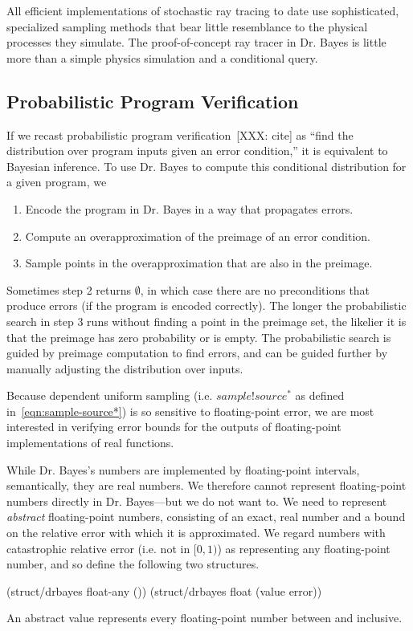 All efficient implementations of stochastic ray tracing to date use sophisticated, specialized sampling methods that bear little resemblance to the physical processes they simulate.
The proof-of-concept ray tracer in Dr. Bayes is little more than a simple physics simulation and a conditional query.


\subsection{Probabilistic Program Verification}

If we recast probabilistic program verification~[XXX: cite] as ``find the distribution over program inputs given an error condition,'' it is equivalent to Bayesian inference.
To use Dr. Bayes to compute this conditional distribution for a given program, we
\begin{enumerate}
	\item Encode the program in Dr. Bayes in a way that propagates errors.
	\item Compute an overapproximation of the preimage of an error condition.
	\item Sample points in the overapproximation that are also in the preimage.
\end{enumerate}
Sometimes step 2 returns $\emptyset$, in which case there are no preconditions that produce errors (if the program is encoded correctly).
The longer the probabilistic search in step 3 runs without finding a point in the preimage set, the likelier it is that the preimage has zero probability or is empty.
The probabilistic search is guided by preimage computation to find errors, and can be guided further by manually adjusting the distribution over inputs.

Because dependent uniform sampling (i.e. $sample!source^*$ as defined in~\eqref{eqn:sample-source*}) is so sensitive to floating-point error, we are most interested in verifying error bounds for the outputs of floating-point implementations of real functions.

While Dr. Bayes's numbers are implemented by floating-point intervals, semantically, they are real numbers.
We therefore cannot represent floating-point numbers directly in Dr. Bayes---but we do not want to.
We need to represent \emph{abstract} floating-point numbers, consisting of an exact, real number and a bound on the relative error with which it is approximated.
We regard numbers with catastrophic relative error (i.e. not in $[0,1)$) as representing any floating-point number, and so define the following two structures.
\begin{center}\singlespacing
\begin{schemedisplay}
(struct/drbayes float-any ())
(struct/drbayes float (value error))
\end{schemedisplay}
\end{center}
An abstract value  represents every floating-point number between  and  inclusive.

